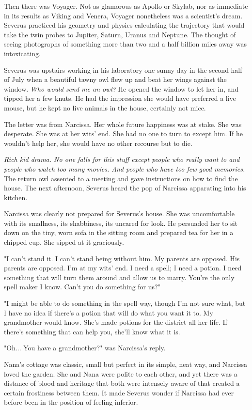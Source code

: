 Then there was Voyager. Not as glamorous as Apollo or Skylab, nor as immediate in its results as Viking and Venera, Voyager nonetheless was a scientist's dream. Severus practiced his geometry and physics calculating the trajectory that would take the twin probes to Jupiter, Saturn, Uranus and Neptune. The thought of seeing photographs of something more than two and a half billion miles away was intoxicating.

Severus was upstairs working in his laboratory one sunny day in the second half of July when a beautiful tawny owl flew up and beat her wings against the window. \emph{Who would send me an owl?} He opened the window to let her in, and tipped her a few knuts. He had the impression she would have preferred a live mouse, but he kept no live animals in the house, certainly not mice.

The letter was from Narcissa. Her whole future happiness was at stake. She was desperate. She was at her wits' end. She had no one to turn to except him. If he wouldn't help her, she would have no other recourse but to die.

\emph{Rich kid drama. No one falls for this stuff except people who really want to and people who watch too many movies. And people who have too few good memories.} The return owl assented to a meeting and gave instructions on how to find the house. The next afternoon, Severus heard the pop of Narcissa apparating into his kitchen.

Narcissa was clearly not prepared for Severus's house. She was uncomfortable with its smallness, its shabbiness, its uncared for look. He persuaded her to sit down on the tiny, worn sofa in the sitting room and prepared tea for her in a chipped cup. She sipped at it graciously.

"I can't stand it. I can't stand being without him. My parents are opposed. His parents are opposed. I'm at my wits' end. I need a spell; I need a potion. I need something that will turn them around and allow us to marry. You're the only spell maker I know. Can't you do something for us?"

"I might be able to do something in the spell way, though I'm not sure what, but I have no idea if there's a potion that will do what you want it to. My grandmother would know. She's made potions for the district all her life. If there's something that can help you, she'll know what it is.

"Oh... You have a grandmother?" was Narcissa's reply.

Nana's cottage was classic, small but perfect in its simple, neat way, and Narcissa loved the garden. She and Nana were polite to each other, and yet there was a distance of blood and heritage that both were intensely aware of that created a certain frostiness between them. It made Severus wonder if Narcissa had ever before been in the position of feeling inferior.


